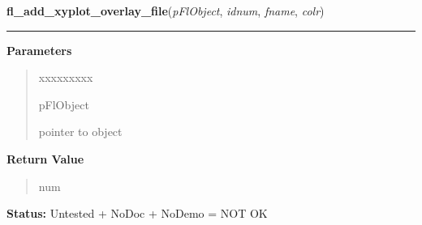 \hspace{.8\funcindent}\begin{boxedminipage}{\funcwidth}

    \raggedright \textbf{fl\_add\_xyplot\_overlay\_file}(\textit{pFlObject}, \textit{idnum}, \textit{fname}, \textit{colr})

    \vspace{-1.5ex}

    \rule{\textwidth}{0.5\fboxrule}
\setlength{\parskip}{2ex}
\setlength{\parskip}{1ex}
      \textbf{Parameters}
      \vspace{-1ex}

      \begin{quote}
        \begin{Ventry}{xxxxxxxxx}

          \item[pFlObject]

          pointer to object

        \end{Ventry}

      \end{quote}

      \textbf{Return Value}
    \vspace{-1ex}

      \begin{quote}
      num

      \end{quote}

\textbf{Status:} Untested + NoDoc + NoDemo = NOT OK



    \end{boxedminipage}

    \label{xformslib:flxyplot:fl_set_xyplot_return}

    \vspace{0.5ex}

